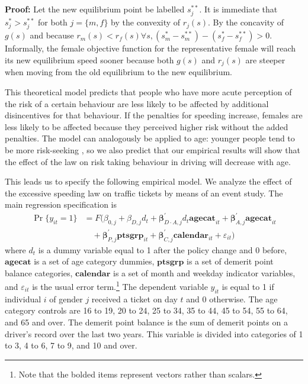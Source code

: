 \documentclass{cje}
\begin{document}
\textbf{Proof:} Let the new equilibrium point be labelled $s_j^{**}$. 
It is immediate that $s_j^*>s_j^{**}$ 
for both $j=\{m,f\}$ by the convexity of $r_j (s)$. 
By the concavity of $g(s)$ 
and because 
$r_m (s)<r_f (s)  \forall s, 
(s_m^*-s_m^{**} ) - (s_f^*-s_f^{**})>0$. \qedsymbol \\



Informally, the female objective function for the representative female 
will reach its new equilibrium speed sooner 
because both $g(s)$ and $r_j (s)$ are steeper 
when moving from the old equilibrium to the new equilibrium.

This theoretical model predicts that people who 
have more acute perception of the risk of
a certain behaviour are less likely to be affected 
by additional disincentives for that behaviour. 
If the penalties for speeding increase, 
females are less likely to be affected because 
they perceived higher risk without the added penalties.  
The model can analogously be applied to age: 
younger people tend to be more risk-seeking 
\citep[e.g.][]{gongyang2012}, 
so we also predict that our empirical results will show that the effect of the law 
on risk taking behaviour in driving will decrease with age.



This leads us to specify the following empirical model.
% 
We analyze the effect of the excessive speeding law on traffic tickets 
by means of an event study. 
The main regression specification is
%
\begin{align*}
\Pr\{y_{it} = 1\} & 	
			= F( \beta_{0,j} + \beta_{D,j} d_t
      		+ \bm{\beta}_{D\cdot A,j}^{\prime} d_t \bm{agecat}_{it} 
	 		+ \bm{\beta}_{A,j}^{\prime} \bm{agecat}_{it} \\
         &	\quad
			+ \bm{\beta}_{P,j}^{\prime} \bm{ptsgrp}_{it}
      		+ \bm{\beta}_{C,j}^{\prime} \bm{calendar}_{it}
      		+ \varepsilon_{it} )
\end{align*}
%
where $d_t$ is a dummy variable equal to 
1 after the policy change and 0 before, 
$\bm{agecat}$ is a set of age category dummies, 
$\bm{ptsgrp}$ is a set of demerit point balance categories, 
$\bm{calendar}$ is a set of month and weekday indicator variables, 
and $\varepsilon_{it}$ is the usual error term.\footnote{%
Note that the bolded items represent vectors rather than scalars.}
%  
The dependent variable $y_{it}$ is equal to 1 if individual $i$ 
of gender $j$ 
received a ticket on day $t$ and 0 otherwise. 
The age category controls are 
16 to 19, 20 to 24, 25 to 34, 35 to 44, 45 to 54, 55 to 64, and 65 and over. 
The demerit point balance is the sum of demerit points 
on a driver’s record over the last two years. 
This variable is divided into categories of 1 to 3, 4 to 6, 7 to 9, and 10 and over.
\end{document}
